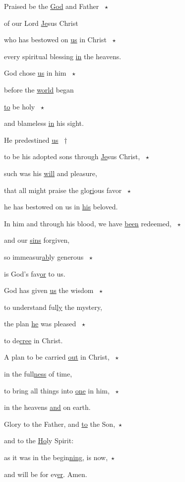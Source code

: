 \noindent Praised be the \uline{God} and Father ~$\star$~\nopagebreak

of our Lord \uline{Je}sus Christ

\noindent who has bestowed on \uline{us} in Christ ~$\star$~\nopagebreak

every spiritual blessing \uline{in} the heavens.

\noindent God chose \uline{us} in him ~$\star$~\nopagebreak

before the \uline{world} began

\noindent \uline{to} be holy ~$\star$~\nopagebreak

and blameless \uline{in} his sight.

\noindent He predestined \uline{us} ~†~\nopagebreak

to be his adopted sons through \uline{Je}sus Christ, ~$\star$~\nopagebreak

such was his \uline{will} and pleasure,

\noindent that all might praise the glo\uline{ri}ous favor ~$\star$~\nopagebreak

he has bestowed on us in \uline{his} beloved.

\noindent In him and through his blood, we have \uline{been} redeemed, ~$\star$~\nopagebreak

and our \uline{sins} forgiven,

\noindent so immeasur\uline{ab}ly generous ~$\star$~\nopagebreak

is God’s fav\uline{or} to us.

\noindent God has given \uline{us} the wisdom ~$\star$~\nopagebreak

to understand ful\uline{ly} the mystery,

\noindent the plan \uline{he} was pleased ~$\star$~\nopagebreak

to de\uline{cree} in Christ.

\noindent A plan to be carried \uline{out} in Christ, ~$\star$~\nopagebreak

in the full\uline{ness} of time,

\noindent to bring all things into \uline{one} in him, ~$\star$~\nopagebreak

in the heavens \uline{and} on earth.

\noindent Glory to the Father, and \uline{to} the Son,~$\star$~\nopagebreak

and to the \uline{Ho}ly Spirit:

\noindent as it was in the begin\uline{ning}, is now,~$\star$~\nopagebreak

and will be for ev\uline{er}. Amen.
